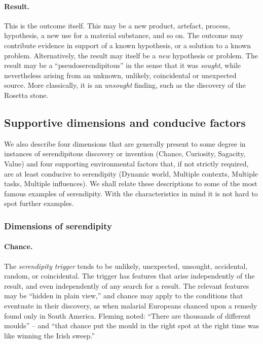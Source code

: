 \paragraph{Result.}

This is the outcome itself. This may be a new product, artefact,
process, hypothesis, a new use for a material substance, and so on.
The outcome may contribute evidence in support of a known hypothesis,
or a solution to a known problem.  Alternatively, the result may
itself be a {\em new} hypothesis or problem.  The result may be a
``pseudoserendipitous'' in the sense that it was {\em sought}, while
nevertheless arising from an unknown, unlikely, coincidental or
unexpected source.  More classically, it is an \emph{unsought}
finding, such as the discovery of the Rosetta stone.

\subsection{Supportive dimensions and conducive factors}

We also describe four dimensions that are generally present to some
degree in instances of serendipitous discovery or invention (Chance,
Curiosity, Sagacity, Value) and four supporting environmental factors
that, if not strictly required, are at least conducive to serendipity
(Dynamic world, Multiple contexts, Multiple tasks, Multiple
influences). We shall relate these descriptions to some of the most
famous examples of serendipity.  With the characteristics in mind it
is not hard to spot further examples.

\subsubsection*{Dimensions of serendipity}

\paragraph{Chance.}

The {\em serendipity trigger} tends to be unlikely, unexpected,
unsought, accidental, random, or coincidental.  The trigger has
features that arise independently of the result, and even
independently of any search for a result.  The relevant features may
be ``hidden in plain view,'' and chance may apply to the conditions
that eventuate in their discovery, as when malarial Europeans chanced
upon a remedy found only in South America.  Fleming \citeyear{fleming}
noted: ``There are thousands of different moulds'' -- and ``that
chance put the mould in the right spot at the right time was like
winning the Irish sweep.''

